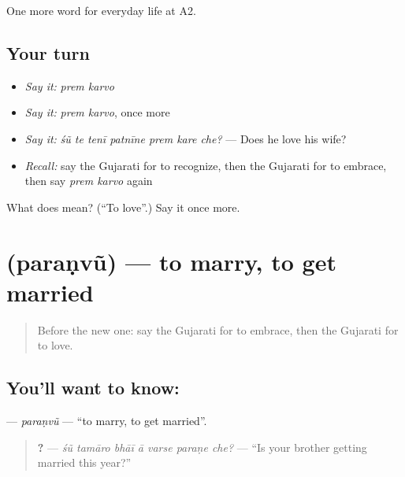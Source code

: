 \begin{grammarlens}[title={What you've built}]
One more word for everyday life at A2.
\end{grammarlens}

\subsection*{Your turn}
\begin{itemize}
\raggedright
  \item \emph{Say it:} \emph{prem karvo}
  \item \emph{Say it:} \emph{prem karvo}, once more
  \item \emph{Say it:} \emph{śũ te tenī patnīne prem kare che?} — Does he love his wife?
  \item \emph{Recall:} say the Gujarati for to recognize, then the Gujarati for to embrace, then say \emph{prem karvo} again
\end{itemize}

\begin{tcolorbox}[breakable,colback=teal!4,colframe=teal!35!black,title={Before you move on}]
What does   mean? (\textquotedblleft{}To love\textquotedblright{}.) Say it once more.
\end{tcolorbox}
\section[\texorpdfstring{\gu{પરણવું} (paraṇvũ)}{પરણવું (paraṇvũ)}]{ (paraṇvũ) — to marry, to get married}

\label{lesson:GU-C265-paranvu}



\begin{quote}
Before the new one: say the Gujarati for to embrace, then the Gujarati for to love.
\end{quote}

\subsection*{You'll want to know: }
\textbf{} — \emph{paraṇvũ} — \textquotedblleft{}to marry, to get married\textquotedblright{}.

\begin{quote}
\textbf{      ?} — \emph{śũ tamāro bhāī ā varse paraṇe che?} — \textquotedblleft{}Is your brother getting married this year?\textquotedblright{}
\end{quote}

